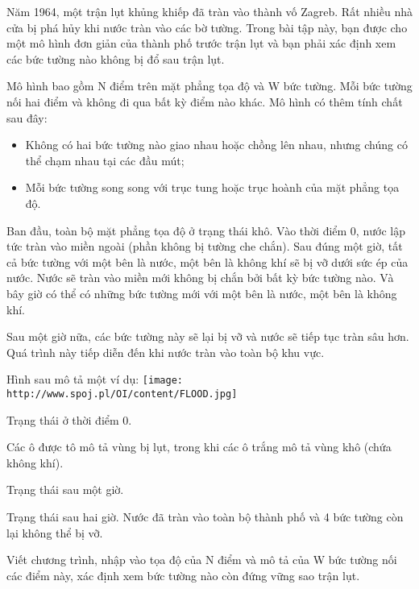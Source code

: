 Năm 1964, một trận lụt khủng khiếp đã tràn vào thành vố Zagreb. Rất nhiều nhà cửa bị phá hủy khi nước tràn vào các bờ tường. Trong bài tập này, bạn được cho một mô hình đơn giản của thành phố trước trận lụt và bạn phải xác định xem các bức tường nào không bị đổ sau trận lụt.  

   Mô hình bao gồm N điểm trên mặt phẳng tọa độ và W bức tường. Mỗi bức tường nối hai điểm và không đi qua bất kỳ điểm nào khác. Mô hình có thêm tính chất sau đây:  
\begin{itemize}
	\item     Không có hai bức tường nào giao nhau hoặc chồng lên nhau, nhưng chúng có thể chạm nhau tại các đầu mút;   
	\item     Mỗi bức tường song song với trục tung hoặc trục hoành của mặt phẳng tọa độ.   
\end{itemize}

   Ban đầu, toàn bộ mặt phẳng tọa độ ở trạng thái khô. Vào thời điểm 0, nước lập tức tràn vào miền ngoài (phần không bị tường che chắn). Sau đúng một giờ, tất cả bức tường với một bên là nước, một bên là không khí sẽ bị vỡ dưới sức ép của nước. Nước sẽ tràn vào miền mới không bị chắn bởi bất kỳ bức tường nào. Và bây giờ có thể có những bức tường mới với một bên là nước, một bên là không khí.  

   Sau một giờ nữa, các bức tường này sẽ lại bị vỡ và nước sẽ tiếp tục tràn sâu hơn. Quá trình này tiếp diễn đến khi nước tràn vào toàn bộ khu vực.  

   Hình sau mô tả một ví dụ:  
\texttt{[image: http://www.spoj.pl/OI/content/FLOOD.jpg]}

   Trạng thái ở thời điểm 0.  

   Các ô được tô mô tả vùng bị lụt, trong khi các ô trắng mô tả vùng khô (chứa không khí).  

   Trạng thái sau một giờ.  

   Trạng thái sau hai giờ. Nước đã tràn vào toàn bộ thành phố và 4 bức tường còn lại không thể bị vỡ.  

Viết chương trình, nhập vào tọa độ của N điểm và mô tả của W bức tường nối các điểm này, xác định xem bức tường nào còn đứng vững sao trận lụt.